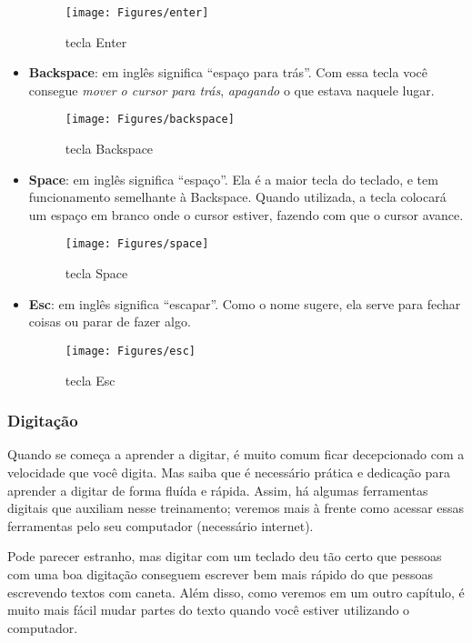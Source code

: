 \documentclass[hidelinks,12pt]{article}
\begin{document}
\begin{itemize}
{	\begin{figure}[!h]
	    \centering
		\texttt{[image: Figures/enter]}
		\label{fig:enter}
		\caption{tecla Enter}
	\end{figure}
	}

	\item { \textbf{Backspace}: em inglês significa ``espaço para trás''. Com essa tecla você consegue \emph{mover o cursor para trás}, \emph{apagando} o que estava naquele lugar.
	
    \begin{figure}[!h]
	    \centering
		\texttt{[image: Figures/backspace]}
		\label{fig:backspace}
		\caption{tecla Backspace}
	\end{figure}
	}

	\item { \textbf{Space}: em inglês significa ``espaço''. Ela é a maior tecla do teclado, e tem funcionamento semelhante à Backspace. Quando utilizada, a tecla colocará um espaço em branco onde o cursor estiver, fazendo com que o cursor avance.
    
    \begin{figure}[!h]
	    \centering
		\texttt{[image: Figures/space]}
		\label{fig:space}
		\caption{tecla Space}
	\end{figure}
	}

	\item { \textbf{Esc}: em inglês significa ``escapar''. Como o nome sugere, ela serve para fechar coisas ou parar de fazer algo.
	
	\begin{figure}[!h]
	    \centering
		\texttt{[image: Figures/esc]}
		\label{fig:esc}
		\caption{tecla Esc}
	\end{figure}
	}

\end{itemize}


\subsubsection{Digitação}

Quando se começa a aprender a digitar, é muito comum ficar decepcionado com a velocidade que você digita. Mas saiba que é necessário  prática e dedicação para aprender a digitar de forma fluída e rápida. Assim, há algumas ferramentas digitais que auxiliam nesse treinamento; veremos mais à frente como acessar essas ferramentas pelo seu computador (necessário internet).

Pode parecer estranho, mas digitar com um teclado deu tão certo que pessoas com uma boa digitação conseguem escrever bem mais rápido do que pessoas escrevendo textos com caneta. Além disso, como veremos em um outro capítulo, é muito mais fácil mudar partes do texto quando você estiver utilizando o computador.
\end{document}
